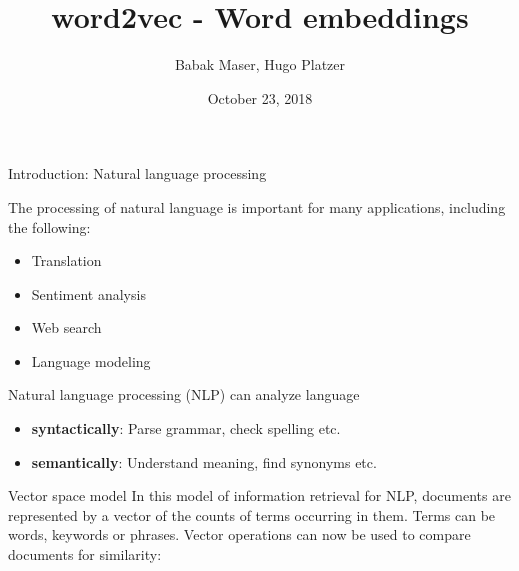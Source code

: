 \documentclass{beamer}
\title[Your Short Title]{word2vec - Word embeddings}
\author{Babak Maser, Hugo Platzer}
\date{October 23, 2018}
\begin{document}
\begin{frame}
  \titlepage
\end{frame}

\begin{frame}{Introduction: Natural language processing}

The processing of natural language is important for many applications, including the following:

\begin{itemize}
    \item Translation
    \item Sentiment analysis
    \item Web search
    \item Language modeling
\end{itemize}

Natural language processing (NLP) can analyze language
\begin{itemize}
    \item {\bf syntactically}: Parse grammar, check spelling etc.
    \item {\bf semantically}: Understand meaning, find synonyms etc.
\end{itemize}
\end{frame}



\begin{frame}{Vector space model}
In this model of information retrieval for NLP, documents are represented by a vector of the counts of terms occurring in them. Terms can be words, keywords or phrases. Vector operations can now be used to compare documents for similarity:

\centering
\vspace{1cm}
\end{frame}
\end{document}
